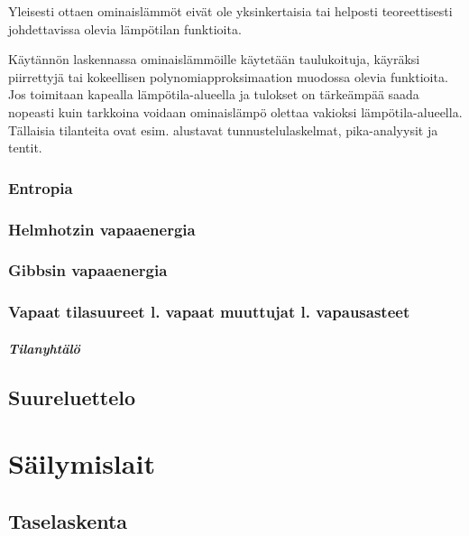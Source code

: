 \documentclass[12pt,a4paper,finnish]{book}
\begin{document}
Yleisesti ottaen ominaislämmöt eivät ole yksinkertaisia tai helposti teoreettisesti johdettavissa olevia lämpötilan 
funktioita. 

Käytännön laskennassa ominaislämmöille käytetään taulukoituja, käyräksi piirrettyjä tai kokeellisen 
polynomiapproksimaation muodossa olevia funktioita. Jos toimitaan kapealla lämpötila-alueella ja tulokset on 
tärkeämpää saada nopeasti kuin tarkkoina voidaan ominaislämpö olettaa vakioksi lämpötila-alueella. Tällaisia tilanteita 
ovat esim. alustavat tunnustelulaskelmat, pika-analyysit ja tentit.


\subsection{Entropia}

\subsection{Helmhotzin vapaaenergia}

\subsection{Gibbsin vapaaenergia}

\subsection{Vapaat tilasuureet l. vapaat muuttujat l. vapausasteet}

\paragraph{Tilanyhtälö}

\section{Suureluettelo}

\chapter{Säilymislait} %

\section{Taselaskenta}
\end{document}

